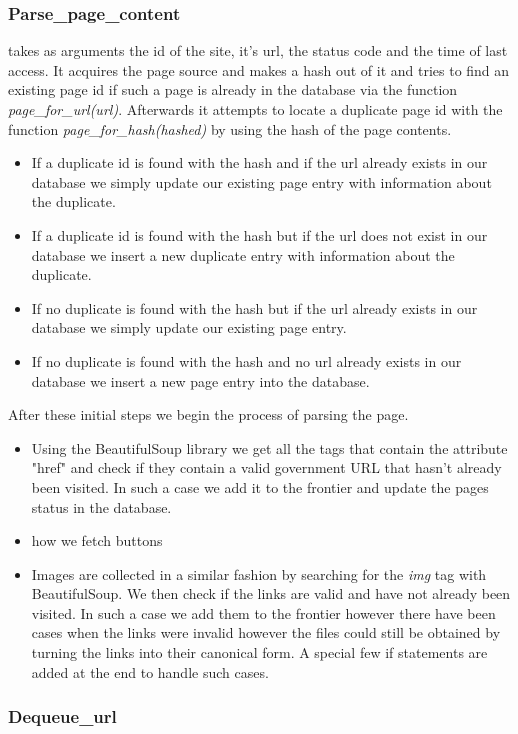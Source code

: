\documentclass[runningheads]{llncs}
\begin{document}
\subsubsection{Parse\_page\_content}
takes as arguments the id of the site, it's url, the status code and the time of last access. It acquires the page source and makes a hash out of it and tries to find an existing page id if such a page is already in the database via the function \textit{page\_for\_url(url)}. Afterwards it attempts to locate a duplicate page id with the function \textit{page\_for\_hash(hashed)} by using the hash of the page contents. 
\begin{itemize}
  \item If a duplicate id is found with the hash and if the url already exists in our database we simply update our existing page entry with information about the duplicate.
  \item If a duplicate id is found with the hash but if the url does not exist in our database we insert a new duplicate entry with information about the duplicate.
  \item If no duplicate is found with the hash but if the url already exists in our database we simply update our existing page entry.
  \item If no duplicate is found with the hash and no url already exists in our database we insert a new page entry into the database.
\end{itemize}
After these initial steps we begin the process of parsing the page.
\begin{itemize}
\item Using the BeautifulSoup library we get all the tags that contain the attribute "href" and check if they contain a valid government URL that hasn't already been visited. In such a case we add it to the frontier and update the pages status in the database.
\item how we fetch buttons
\item Images are collected in a similar fashion by searching for the \textit{img} tag with BeautifulSoup. We then check if the links are valid and have not already been visited. In such a case we add them to the frontier however there have been cases when the links were invalid however the files could still be obtained by turning the links into their canonical form. A special few if statements are added at the end to handle such cases.
\end{itemize}
\subsubsection{Dequeue\_url}
\end{document}
